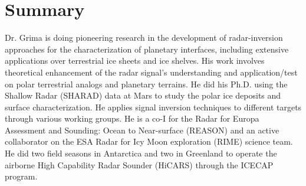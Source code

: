 \section*{Summary}

Dr. Grima is doing pioneering research in the development of radar-inversion approaches for the characterization of planetary interfaces, including extensive applications over terrestrial ice sheets and ice shelves. His work involves theoretical enhancement of the radar signal’s understanding and application/test on polar terrestrial analogs and planetary terrains. He did his Ph.D. using the Shallow Radar (SHARAD) data at Mars to study the polar ice deposits and surface characterization. He applies signal inversion techniques to different targets through various working groups. He is a co-I for the Radar for Europa Assessment and Sounding: Ocean to Near-surface (REASON) and an active collaborator on the ESA Radar for Icy Moon exploration (RIME) science team. He did two field seasons in Antarctica and two in Greenland to operate the airborne High Capability Radar Sounder (HiCARS) through the ICECAP program.